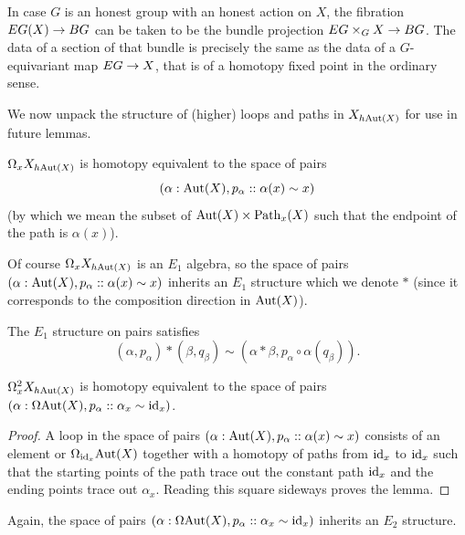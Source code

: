 \documentclass{amsart}
\begin{document}
\begin{remark}
In case $G$ is an honest group with an honest action on $X$, the fibration $EG(X) \rightarrow BG$ can be taken to be the bundle projection $EG \times_G X \rightarrow BG$.  The data of a section of that bundle is precisely the same as the data of a $G$-equivariant map $EG \rightarrow X$, that is of a homotopy fixed point in the ordinary sense.
\end{remark}

We now unpack the structure of (higher) loops and paths in $X_{h\mathrm{Aut}(X)}$ for use in future lemmas.

\begin{lemma}
$\Omega_x X_{h\mathrm{Aut}(X)}$ is homotopy equivalent to the space of pairs \[(\alpha: \mathrm{Aut}(X), p_\alpha:: \alpha(x) \sim x)\] (by which we mean the subset of $\mathrm{Aut}(X) \times \mathrm{Path}_x(X)$ such that the endpoint of the path is $\alpha(x)$).
\end{lemma}

Of course $\Omega_x X_{h\mathrm{Aut}(X)}$ is an $E_1$ algebra, so the space of pairs $(\alpha: \mathrm{Aut}(X), p_\alpha:: \alpha(x) \sim x)$ inherits an $E_1$ structure which we denote $\ast$ (since it corresponds to the composition direction in $\mathrm{Aut}(X)$).

\begin{lemma}
The $E_1$ structure on pairs satisfies 
\[(\alpha, p_\alpha) \ast (\beta, q_\beta) \sim (\alpha \ast \beta, p_\alpha \circ \alpha(q_\beta)).\]
\end{lemma}

\begin{lemma}
\label{lem:doublelooptotal}
$\Omega_x^2 X_{h\mathrm{Aut}(X)}$ is homotopy equivalent to the space of pairs $(\alpha: \Omega \mathrm{Aut}(X), p_\alpha:: \alpha_x \sim \mathrm{id}_x)$.
\end{lemma}
\begin{proof}
A loop in the space of pairs $(\alpha: \mathrm{Aut}(X), p_\alpha:: \alpha(x) \sim x)$ consists of an element or $\Omega_{\mathrm{id}_x} \mathrm{Aut}(X)$ together with a homotopy of paths from $\mathrm{id}_x$ to $\mathrm{id}_x$ such that the starting points of the path trace out the constant path $\mathrm{id}_x$ and the ending points trace out $\alpha_x$. Reading this square sideways proves the lemma.
\end{proof}

Again, the space of pairs $(\alpha: \Omega \mathrm{Aut}(X), p_\alpha:: \alpha_x \sim \mathrm{id}_x)$ inherits an $E_2$ structure.

\end{document}
